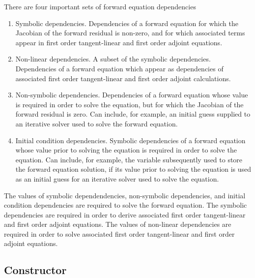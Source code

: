 \documentclass[11pt]{article}
\begin{document}
There are four important sets of forward equation dependencies
\begin{enumerate}
  \item Symbolic dependencies. Dependencies of a forward equation for which the
    Jacobian of the forward residual is non-zero, and for which associated
    terms appear in first order tangent-linear and first order adjoint
    equations.
  \item Non-linear dependencies. A subset of the symbolic dependencies.
    Dependencies of a forward equation which appear as dependencies of
    associated first order tangent-linear and first order adjoint calculations.
  \item Non-symbolic dependencies. Dependencies of a forward equation whose
    value is required in order to solve the equation, but for which the
    Jacobian of the forward residual is zero. Can include, for example, an
    initial guess supplied to an iterative solver used to solve the forward
    equation.
  \item Initial condition dependencies. Symbolic dependencies of a forward
    equation whose value prior to solving the equation is required in order to
    solve the equation. Can include, for example, the variable subsequently
    used to store the forward equation solution, if its value prior to solving
    the equation is used as an initial guess for an iterative solver used to
    solve the equation.
\end{enumerate}
The values of symbolic dependendencies, non-symbolic dependencies, and initial
condition dependencies are required to solve the forward equation. The symbolic
dependencies are required in order to derive associated first order
tangent-linear and first order adjoint equations. The values of non-linear
dependencies are required in order to solve associated first order
tangent-linear and first order adjoint equations.

\subsection{Constructor}
\end{document}
